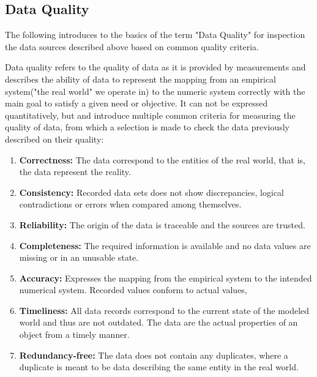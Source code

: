 \subsection{Data Quality}

The following introduces to the basics of the term "Data Quality" for inspection the data sources
described above based on common quality criteria.

Data quality refers to the quality of data as it is provided by measurements and describes the
ability of data to represent the mapping from an empirical system("the real world" we operate in)
to the numeric system correctly with the main goal to satisfy a given need or objective.
It can not be expressed quantitatively, but \cite{Daqua13} and  \cite{Ebert07} introduce multiple
common criteria for measuring the quality of data, from which a selection is made to check the data
previously described on their quality:

\begin{enumerate}
    \item \textbf{Correctness:}
    The data correspond to the entities of the real world, that is, the data represent the reality.

    \item \textbf{Consistency:}
    Recorded data sets does not show discrepancies, logical contradictions or errors when compared
    among themselves.

    \item \textbf{Reliability:}
    The origin of the data is traceable and the sources are trusted.

    \item \textbf{Completeness:}
    The required information is available and no data values are missing or in an unusable state.

    \item \textbf{Accuracy:}
    Expresses the mapping from the empirical system to the intended numerical system. Recorded values
    conform to actual values,

    \item \textbf{Timeliness:}
    All data records correspond to the current state of the modeled world and thus are not outdated.
    The data are the actual properties of an object from a timely manner.

    \item \textbf{Redundancy-free:}
    The data does not contain any duplicates, where a duplicate is meant to be data describing the same entity
    in the real world.
\end{enumerate}

